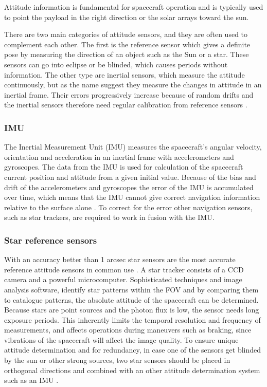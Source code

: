 Attitude information is fundamental for spacecraft operation and is typically used to point the payload in the right direction or the solar arrays toward the sun. 

There are two main categories of attitude sensors, and they are often used to complement each
other. The first is the reference sensor which gives a definite pose by measuring the direction of an object
such as the Sun or a star. These sensors can go into eclipse or be blinded, which causes periods without information. The other type are inertial sensors, which measure the attitude continuously, but as the name suggest they measure the changes in attitude in an inertial frame. Their errors progressively increase because of random drifts and the inertial sensors therefore need regular calibration from reference sensors \cite{spacecraft}.

\subsubsection{IMU}
The Inertial Measurement Unit (IMU) measures the spacecraft's angular velocity, orientation and acceleration in an inertial frame with accelerometers and gyroscopes. The data from the IMU is used for calculation of the spacecraft current position and attitude from a given initial value. Because of the bias and drift of the accelerometers and gyroscopes the error of the IMU is accumulated over time, which means that the IMU cannot give correct navigation information relative to the surface alone \cite{IMUcamb}.
To correct for the error other navigation sensors, such as star trackers, are required to work in fusion with the IMU. 



\subsubsection{Star reference sensors}
With an accuracy better than 1 arcsec star sensors are the most accurate reference attitude sensors in common use \cite{spacecraft}. A star tracker consists of a CCD camera and a powerful microcomputer. Sophisticated techniques and image analysis software, identify star patterns within the FOV and by comparing them to catalogue patterns, the absolute attitude of the spacecraft can be determined.  Because stars are point sources and the photon flux is low, the sensor needs long exposure periods. This inherently limits the temporal resolution and frequency of measurements, and affects operations during maneuvers such as braking, since vibrations of the spacecraft will affect the image quality. To ensure unique attitude determination and for redundancy, in case one of the sensors get blinded by the sun or other strong sources, two star sensors should be placed in orthogonal directions and combined with an other attitude determination system such as an IMU \cite{alessandro}.

